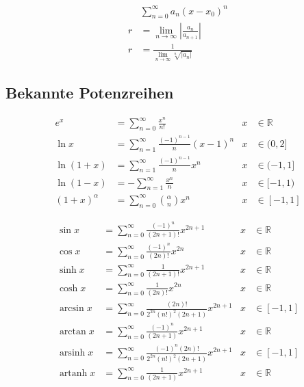 \begin{boxleft}
\end{boxleft}\begin{boxrightshaded}
\begin{align*}
&\sum_{n=0}^\infty a_n \left(x-x_0\right)^n\\
r&=\lim_{n\to\infty}\left|\frac{a_n}{a_{n+1}}\right|\\
r&=\frac{1}{\lim_{n\to\infty}\sqrt[n]{\left|a_n\right|}}
\end{align*}
\end{boxrightshaded}

\subsection{Bekannte Potenzreihen}

\begin{boxleft}
\end{boxleft}\begin{boxrightshaded}
\begin{align*}
e^x&=\sum_{n=0}^\infty\frac{x^n}{n!}&x&\in\mathbb{R}\\
\ln x&=\sum_{n=1}^\infty\frac{\left(-1\right)^{n-1}}{n}\left(x-1\right)^n&x&\in(0,2]\\
\ln\left(1+x\right)&=\sum_{n=1}^\infty\frac{\left(-1\right)^{n-1}}{n}x^n&x&\in(-1,1]\\
\ln\left(1-x\right)&=-\sum_{n=1}^\infty\frac{x^n}{n}&x&\in[-1,1)\\
\left(1+x\right)^\alpha&=\sum_{n=0}^\infty\binom{\alpha}{n}x^n&x&\in[-1,1]
\end{align*}
\end{boxrightshaded}

\begin{boxleft}
\end{boxleft}\begin{boxrightshaded}
\begin{align*}
\sin x&=\sum_{n=0}^\infty\frac{\left(-1\right)^n}{\left(2n+1\right)!}x^{2n+1}&x&\in\mathbb{R}\\
\cos x&=\sum_{n=0}^\infty\frac{\left(-1\right)^n}{\left(2n\right)!}x^{2n}&x&\in\mathbb{R}\\
\sinh x&=\sum_{n=0}^\infty\frac{1}{\left(2n+1\right)!}x^{2n+1}&x&\in\mathbb{R}\\
\cosh x&=\sum_{n=0}^\infty\frac{1}{\left(2n\right)!}x^{2n}&x&\in\mathbb{R}\\
\arcsin x &=\sum_{n=0}^\infty\frac{\left(2n\right)!}{2^{2n}\left(n!\right)^2\left(2n+1\right)}x^{2n+1}&x&\in[-1,1]\\
\arctan x &=\sum_{n=0}^\infty\frac{\left(-1\right)^n}{\left(2n+1\right)}x^{2n+1}&x&\in\mathbb{R}\\
\operatorname{ar sinh} x &=\sum_{n=0}^\infty\frac{\left(-1\right)^n\left(2n\right)!}{2^{2n}\left(n!\right)^2\left(2n+1\right)}x^{2n+1}&x&\in[-1,1]\\
\operatorname{ar tanh}  x &=\sum_{n=0}^\infty\frac{1}{\left(2n+1\right)}x^{2n+1}&x&\in\mathbb{R}\\
\end{align*}
\end{boxrightshaded}

